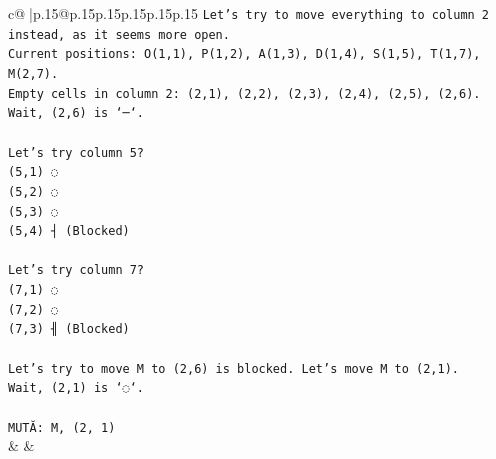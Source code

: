 \documentclass{article}
\begin{document}
{\begin{supertabular}{c@{$\;$}|p{.15\linewidth}@{}p{.15\linewidth}p{.15\linewidth}p{.15\linewidth}p{.15\linewidth}p{.15\linewidth}}
{{{\texttt{Let's try to move everything to column 2 instead, as it seems more open.} \\
\texttt{Current positions: O(1,1), P(1,2), A(1,3), D(1,4), S(1,5), T(1,7), M(2,7).} \\
\texttt{Empty cells in column 2: (2,1), (2,2), (2,3), (2,4), (2,5), (2,6).} \\
\texttt{Wait, (2,6) is `─`.} \\
\\ 
\texttt{Let's try column 5?} \\
\texttt{(5,1) ◌} \\
\texttt{(5,2) ◌} \\
\texttt{(5,3) ◌} \\
\texttt{(5,4) ┤ (Blocked)} \\
\\ 
\texttt{Let's try column 7?} \\
\texttt{(7,1) ◌} \\
\texttt{(7,2) ◌} \\
\texttt{(7,3) ╢ (Blocked)} \\
\\ 
\texttt{Let's try to move M to (2,6) is blocked. Let's move M to (2,1).} \\
\texttt{Wait, (2,1) is `◌`.} \\
\\ 
\texttt{MUTĂ: M, (2, 1)} \\
            }
        }
    }
    & & \\ \\


\end{supertabular}}
\end{document}
